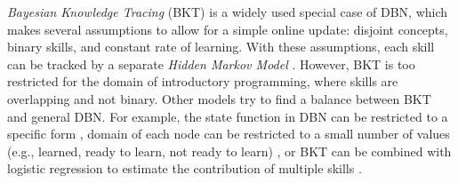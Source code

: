 \emph{Bayesian Knowledge Tracing} (BKT) \cite{bkt} %
is a widely used special case of DBN, which makes several assumptions to allow
for a simple online update: %
disjoint concepts, binary skills, and constant rate of learning.
With these assumptions, each skill can be tracked by a separate
\emph{Hidden Markov Model} \cite{hmm}.
However, BKT is too restricted for the domain of introductory programming,
where skills are
overlapping and not binary. Other models try to find a balance
between BKT and general DBN.
For example, the state function in DBN can be restricted to a specific form
\cite[section 5.1.2]{student-models-review-2012},
domain of each node can be restricted to a small number of values
(e.g., learned, ready to learn, not ready to learn) \cite{its-programming},
or BKT can be combined with logistic regression to estimate the contribution
of multiple skills \cite{bn-logreg}.


